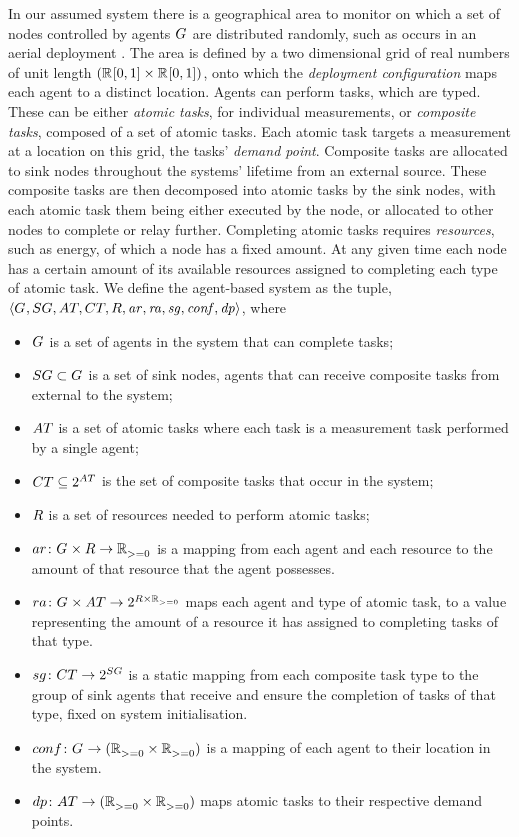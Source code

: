 In our assumed system there is a geographical area to monitor on which a set of nodes controlled by agents $G_{}^{}$ are distributed randomly, such as occurs in an aerial deployment \citep{Kumar2013}.  The area is defined by a two dimensional grid of real numbers of unit length  $(\mathbb{R}_{}^{}[0,1] \times \mathbb{R}_{}^{}[0,1])$, onto which the \textit{deployment configuration} maps each agent to a distinct location.  Agents can perform tasks, which are typed. These can be either \textit{atomic tasks}, for individual measurements, or \textit{composite tasks}, composed of a set of atomic tasks. Each atomic task targets a measurement at a location on this grid, the tasks' \textit{demand point}. Composite tasks are allocated to sink nodes throughout the systems' lifetime from an external source. These composite tasks are then decomposed into atomic tasks by the sink nodes, with each atomic task them being either executed by the node, or allocated to other nodes to complete or relay further. Completing atomic tasks requires \textit{resources}, such as energy, of which a node has a fixed amount. At any given time each node has a certain amount of its  available resources assigned to completing each type of atomic task. We define the agent-based system as the tuple, $\langle 
	\setAgents{}{},
	\setSinkAgents{}{},
	\setAtomicTask{}{},
	\setCompositeTask{}{},
	\setResource{}{},
	\mathit{ar},
	\mathit{ra},
	\mathit{sg},
	\mathit{conf},
	\mathit{dp}
\rangle$, where
\begin{itemize}
	\item $G_{}^{}$ is a set of agents in the system that can complete tasks;
	\item $\setSinkAgents{}{} \subset \setAgents{}{}$ is a set of sink nodes, agents that can receive composite tasks from external to the system;
	\item $\setAtomicTask{}{}$ is a set of atomic tasks where each task is a measurement task performed by a single agent;
	\item $\setCompositeTask{}{} \subseteq \powerSetSymbol{\setAtomicTask{}{}}{}{}$ is the set of composite tasks that occur in the system;
	\item $\setResource{}{}$ is a set of resources needed to perform atomic tasks;
	  \item $\formalAgentResources{}{}$ is a mapping from each agent and each resource to the amount of that resource that the agent possesses.
	 \item $\formalTaskResourceAllocation{}{}$ maps each agent and type of atomic task, to a value representing the amount of a resource it has assigned to completing tasks of that type.
	\item $\formalSinkMapping{}{}$ is a static mapping from each composite task type to the group of sink agents that receive and ensure the completion of tasks of that type, fixed on system initialisation.
	\item $\formalDeployment{}{}$ is a mapping of each agent to their location in the system.
	\item  $\formalTaskDemandPoint{}{}$ maps atomic tasks to their respective demand points.
\end{itemize}

